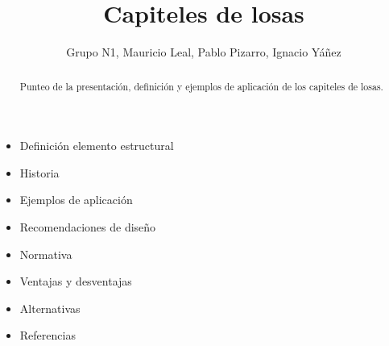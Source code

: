 \documentclass[]{article}
\title{Capiteles de losas}
\author{Grupo N1, Mauricio Leal, Pablo Pizarro, Ignacio Yáñez}
\begin{document}
\maketitle

\begin{abstract}
Punteo de la presentación, definición y ejemplos de aplicación de los capiteles de losas.
\end{abstract}

\begin{itemize}
	\item Definición elemento estructural
	\item Historia
	\item Ejemplos de aplicación
	\item Recomendaciones de diseño
	\item Normativa
	\item Ventajas y desventajas
	\item Alternativas
	\item Referencias
\end{itemize}
\end{document}
